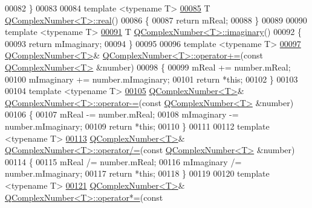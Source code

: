 \begin{DoxyCode}
00082 \}
00083 
00084 \textcolor{keyword}{template} <\textcolor{keyword}{typename} T>
\hypertarget{a00113_source_l00085}{}\hyperlink{a00021_a01ca02979072629fdf76770971bff461}{00085} T \hyperlink{a00021_a01ca02979072629fdf76770971bff461}{QComplexNumber<T>::real}()
00086 \{
00087     \textcolor{keywordflow}{return} mReal;
00088 \}
00089 
00090 \textcolor{keyword}{template} <\textcolor{keyword}{typename} T>
\hypertarget{a00113_source_l00091}{}\hyperlink{a00021_a9fa649f50f64f9e8d26da107c6f779bb}{00091} T \hyperlink{a00021_a9fa649f50f64f9e8d26da107c6f779bb}{QComplexNumber<T>::imaginary}()
00092 \{
00093     \textcolor{keywordflow}{return} mImaginary;
00094 \}
00095 
00096 \textcolor{keyword}{template} <\textcolor{keyword}{typename} T>
\hypertarget{a00113_source_l00097}{}\hyperlink{a00021_a30e8645f1dc443e17849ed65eed5c28f}{00097} \hyperlink{a00021}{QComplexNumber<T>}& \hyperlink{a00021_a30e8645f1dc443e17849ed65eed5c28f}{QComplexNumber<T>::operator+=}(\textcolor{keyword}{const} 
      \hyperlink{a00021}{QComplexNumber<T>} &number)
00098 \{
00099     mReal += number.mReal;
00100     mImaginary += number.mImaginary;
00101     \textcolor{keywordflow}{return} *\textcolor{keyword}{this};
00102 \}
00103 
00104 \textcolor{keyword}{template} <\textcolor{keyword}{typename} T>
\hypertarget{a00113_source_l00105}{}\hyperlink{a00021_a883e0d4ed073f528ac147bb7d792fa99}{00105} \hyperlink{a00021}{QComplexNumber<T>}& \hyperlink{a00021_a883e0d4ed073f528ac147bb7d792fa99}{QComplexNumber<T>::operator-=}(\textcolor{keyword}{const} 
      \hyperlink{a00021}{QComplexNumber<T>} &number)
00106 \{
00107     mReal -= number.mReal;
00108     mImaginary -= number.mImaginary;
00109     \textcolor{keywordflow}{return} *\textcolor{keyword}{this};
00110 \}
00111 
00112 \textcolor{keyword}{template} <\textcolor{keyword}{typename} T>
\hypertarget{a00113_source_l00113}{}\hyperlink{a00021_a070852367a712f7b9dd2dff0ee5c3439}{00113} \hyperlink{a00021}{QComplexNumber<T>}& \hyperlink{a00021_a070852367a712f7b9dd2dff0ee5c3439}{QComplexNumber<T>::operator/=}(\textcolor{keyword}{const} 
      \hyperlink{a00021}{QComplexNumber<T>} &number)
00114 \{
00115     mReal /= number.mReal;
00116     mImaginary /= number.mImaginary;
00117     \textcolor{keywordflow}{return} *\textcolor{keyword}{this};
00118 \}
00119 
00120 \textcolor{keyword}{template} <\textcolor{keyword}{typename} T>
\hypertarget{a00113_source_l00121}{}\hyperlink{a00021_a13c0aad5e700fe92eb9acf5fae669975}{00121} \hyperlink{a00021}{QComplexNumber<T>}& \hyperlink{a00021_a13c0aad5e700fe92eb9acf5fae669975}{QComplexNumber<T>::operator*=}(\textcolor{keyword}{const} 

\end{DoxyCode}
